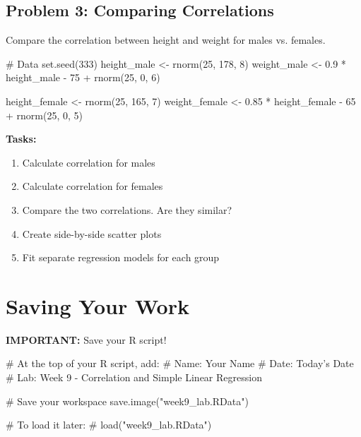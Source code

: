 \documentclass[11pt]{article}
\begin{document}
\vspace{2cm}

\subsection{Problem 3: Comparing Correlations}

Compare the correlation between height and weight for males vs. females.

\begin{rcode}
# Data
set.seed(333)
height_male <- rnorm(25, 178, 8)
weight_male <- 0.9 * height_male - 75 + rnorm(25, 0, 6)

height_female <- rnorm(25, 165, 7)
weight_female <- 0.85 * height_female - 65 + rnorm(25, 0, 5)
\end{rcode}

\textbf{Tasks:}
\begin{enumerate}[label=\alph*)]
\item Calculate correlation for males
\item Calculate correlation for females
\item Compare the two correlations. Are they similar?
\item Create side-by-side scatter plots
\item Fit separate regression models for each group
\end{enumerate}

\vspace{2cm}

\section{Saving Your Work}

\textbf{IMPORTANT:} Save your R script!

\begin{rcode}
# At the top of your R script, add:
# Name: Your Name
# Date: Today's Date
# Lab: Week 9 - Correlation and Simple Linear Regression

# Save your workspace
save.image("week9_lab.RData")

# To load it later:
# load("week9_lab.RData")
\end{rcode}
\end{document}
